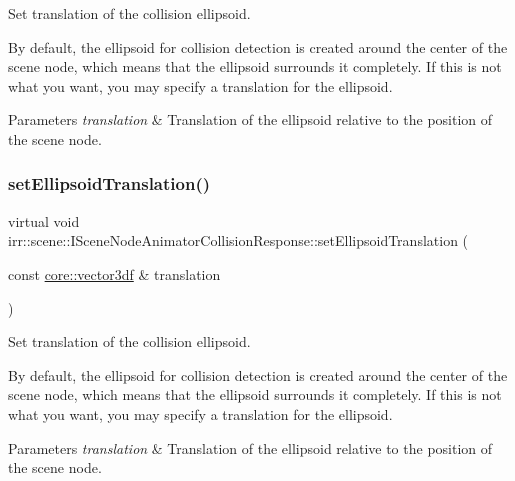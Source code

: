 Set translation of the collision ellipsoid. 

By default, the ellipsoid for collision detection is created around the center of the scene node, which means that the ellipsoid surrounds it completely. If this is not what you want, you may specify a translation for the ellipsoid. 
\begin{DoxyParams}{Parameters}
{\em translation} & Translation of the ellipsoid relative to the position of the scene node. \\
\hline
\end{DoxyParams}
\mbox{\label{classirr_1_1scene_1_1ISceneNodeAnimatorCollisionResponse_a234ec747d320d70dd3e2a4143782ffc7}} 
\subsubsection{\texorpdfstring{set\+Ellipsoid\+Translation()}{setEllipsoidTranslation()}\hspace{0.1cm}{\footnotesize\ttfamily [2/2]}}
{\footnotesize\ttfamily virtual void irr\+::scene\+::\+I\+Scene\+Node\+Animator\+Collision\+Response\+::set\+Ellipsoid\+Translation (\begin{DoxyParamCaption}\item[{const \hyperlink{namespaceirr_1_1core_ae6e2b2a6c552833ebbd5b7463d03586b}{core\+::vector3df} \&}]{translation }\end{DoxyParamCaption})\hspace{0.3cm}{\ttfamily [pure virtual]}}



Set translation of the collision ellipsoid. 

By default, the ellipsoid for collision detection is created around the center of the scene node, which means that the ellipsoid surrounds it completely. If this is not what you want, you may specify a translation for the ellipsoid. 
\begin{DoxyParams}{Parameters}
{\em translation} & Translation of the ellipsoid relative to the position of the scene node. \\
\hline
\end{DoxyParams}
\mbox{\label{classirr_1_1scene_1_1ISceneNodeAnimatorCollisionResponse_af366695a82153c144b58c65cb4d092f3}} 
